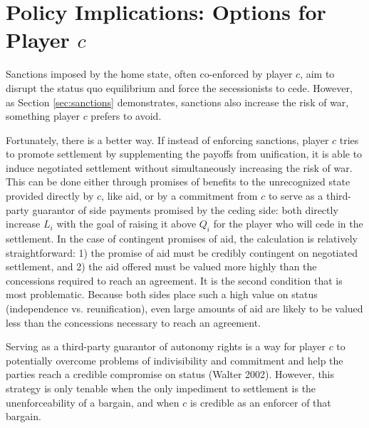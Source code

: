 \documentclass[11pt,letterpaper, notitlepage]{article}
\begin{document}
\section{Policy Implications: Options for Player \texorpdfstring{$c$}{c}}

Sanctions imposed by the home state, often co-enforced by player $c$, aim to disrupt the status quo equilibrium and force the secessionists to cede. However, as Section \ref{sec:sanctions} demonstrates, sanctions also increase the risk of war, something player $c$ prefers to avoid. 

Fortunately, there is a better way. If instead of enforcing sanctions, player $c$ tries to promote settlement by supplementing the payoffs from unification, it is able to induce negotiated settlement without simultaneously increasing the risk of war. This can be done either through promises of benefits to the unrecognized state provided directly by $c$, like aid, or by a commitment from $c$ to serve as a third-party guarantor of side payments promised by the ceding side: both directly increase $L_i$ with the goal of raising it above $Q_i$ for the player who will cede in the settlement. In the case of contingent promises of aid, the calculation is relatively straightforward: 1) the promise of aid must be credibly contingent on negotiated settlement, and 2) the aid offered must be valued more highly than the concessions required to reach an agreement. It is the second condition that is most problematic. Because both sides place such a high value on status (independence vs. reunification), even large amounts of aid are likely to be valued less than the concessions necessary to reach an agreement.

Serving as a third-party guarantor of autonomy rights is a way for player $c$ to potentially overcome problems of indivisibility and commitment and help the parties reach a credible compromise on status (Walter 2002). However, this strategy is only tenable when the only impediment to settlement is the unenforceability of a bargain, and when $c$ is credible as an enforcer of that bargain.

\end{document}
